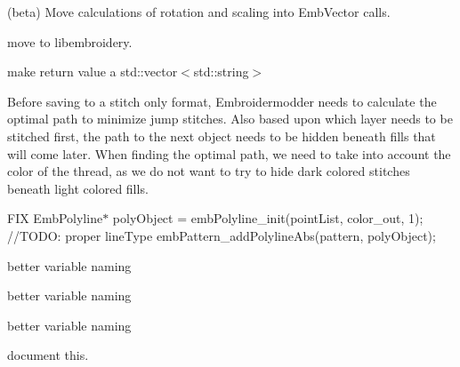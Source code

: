 \begin{DoxyRefList}
\label{todo__todo000163}%
%
(beta) Move calculations of rotation and scaling into {\ttfamily Emb\+Vector} calls. 
\item[Member \mbox{\hyperlink{utility_8cpp_abf62628119dde9fd93f65be6742e2b22}{random\+\_\+uniform}} (void)]\label{todo__todo000013}%
%
move to libembroidery. 
\item[Member \mbox{\hyperlink{class_rect_object_acfde9da59c0bbaaab7decdc222aa38a3}{Rect\+Object\+::all\+Grip\+Points}} ()]\label{todo__todo000009}%
%
make return value a std\+::vector$<$std\+::string$>$  
\item[Member \mbox{\hyperlink{class_save_object_a15bdf578a20c1c1cb630dc8264448484}{Save\+Object\+::save}} (const QString \&file\+Name)]\label{todo__todo000010}%
%
Before saving to a stitch only format, Embroidermodder needs to calculate the optimal path to minimize jump stitches. Also based upon which layer needs to be stitched first, the path to the next object needs to be hidden beneath fills that will come later. When finding the optimal path, we need to take into account the color of the thread, as we do not want to try to hide dark colored stitches beneath light colored fills.  
\item[Member \mbox{\hyperlink{class_save_object_aaa28ee2579ab1b54602812d652889737}{Save\+Object\+::to\+Polyline}} (Emb\+Pattern $\ast$pattern, const QPointF \&obj\+Pos, const QPainter\+Path \&obj\+Path, const QString \&layer, const QColor \&color, const QString \&line\+Type, const QString \&line\+Weight)]\label{todo__todo000011}%
%
FIX Emb\+Polyline$\ast$ poly\+Object = emb\+Polyline\+\_\+init(point\+List, color\+\_\+out, 1); //\+TODO\+: proper line\+Type emb\+Pattern\+\_\+add\+Polyline\+Abs(pattern, poly\+Object);  
\item[Member \mbox{\hyperlink{struct_sub_descriptor___affb2c75b7f632338f368aafab49f678d}{Sub\+Descriptor\+\_\+\+::color\+Code}} ]\label{todo__todo000187}%
%
better variable naming  
\item[Member \mbox{\hyperlink{struct_sub_descriptor___a0cfe04519ff6dab092ee7c002e55e520}{Sub\+Descriptor\+\_\+\+::some\+Int}} ]\label{todo__todo000185}%
%
better variable naming  
\item[Member \mbox{\hyperlink{struct_sub_descriptor___a6154b0f4ec7815c6d26c71852506418e}{Sub\+Descriptor\+\_\+\+::some\+Other\+Int}} ]\label{todo__todo000186}%
%
better variable naming  
\item[Member \mbox{\hyperlink{embroidermodder_8h_a459ace9a6c614fe41b7f08ba91bc6dd4}{Undo\+History}} ]\label{todo__todo000001}%
%
document this. 
\end{DoxyRefList}